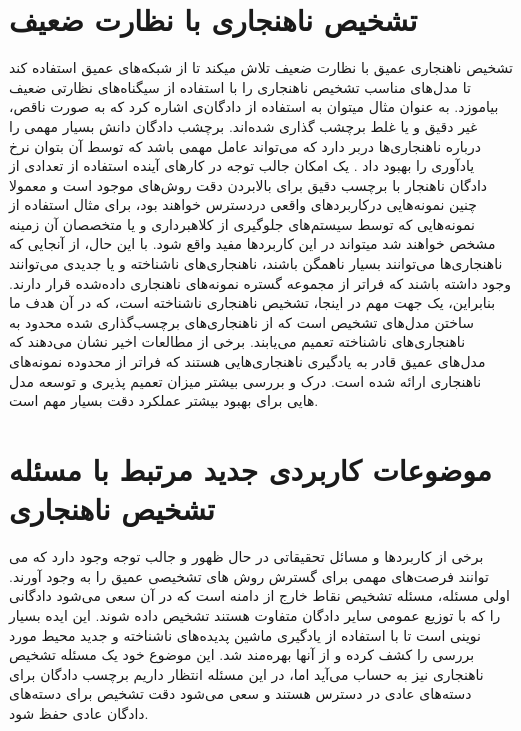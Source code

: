 \documentclass[12pt,a4paper]{report}
\theoremstyle{definition}
\theoremstyle{definition}
\begin{document}
\section{تشخیص ناهنجاری با نظارت ضعیف}
تشخیص ناهنجاری عمیق با نظارت ضعیف\cite{tian2021weakly, https://doi.org/10.48550/arxiv.1910.13601} تلاش میکند تا از شبکه‌های عمیق استفاده کند تا مدل‌های مناسب تشخیص ناهنجاری را با استفاده از سیگناه‌های نظارتی ضعیف بیاموزد. به عنوان مثال میتوان به استفاده از دادگان‌ی اشاره کرد که به صورت ناقص، غیر دقیق و یا غلط برچشب گذاری شده‌اند. برچشب دادگان دانش بسیار مهمی را درباره ناهنجاری‌ها دربر دارد که می‌تواند عامل مهمی باشد که توسط آن بتوان نرخ‌ یادآوری را بهبود داد \cite{0e1339c0e4924d93b1695af2f9e3e03c, https://doi.org/10.48550/arxiv.1910.13601, tian2021weakly, Sultani_2018_CVPR}. یک امکان جالب توجه در کار‌های آینده استفاده از تعدادی از دادگان ناهنجار با برچسب دقیق برای بالابردن دقت روش‌های موجود است و معمولا چنین نمونه‌هایی درکاربرد‌های واقعی دردسترس خواهند بود، برای مثال استفاده از نمونه‌هایی که توسط سیستم‌های جلوگیری از کلاهبرداری و یا متخصصان آن زمینه مشخص خواهند شد میتواند در این کاربرد‌ها مفید واقع شود. با این حال، از آنجایی که ناهنجاری‌ها می‌توانند بسیار ناهمگن باشند، ناهنجاری‌های ناشناخته و یا جدیدی می‌توانند وجود داشته باشند که فراتر از مجموعه گستره نمونه‌های ناهنجاری داده‌شده قرار دارند. بنابراین، یک جهت مهم در اینجا، تشخیص ناهنجاری ناشناخته است، که در آن هدف ما ساختن مدل‌های تشخیص است که از ناهنجاری‌های برچسب‌گذاری شده محدود به ناهنجاری‌های ناشناخته تعمیم می‌یابند. برخی از مطالعات اخیر\cite{Pang_2021, https://doi.org/10.48550/arxiv.1910.13601, pang2019deep, https://doi.org/10.48550/arxiv.1906.02694} نشان می‌دهند که مدل‌های عمیق قادر به یادگیری ناهنجاری‌هایی هستند که فراتر از محدوده نمونه‌های ناهنجاری ارائه شده است. درک و بررسی بیشتر میزان تعمیم پذیری و توسعه مدل هایی برای بهبود بیشتر عملکرد دقت بسیار مهم است. \\

\section{موضوعات کاربردی جدید مرتبط با مسئله تشخیص ناهنجاری}
برخی از کاربرد‌ها و مسائل تحقیقاتی در حال ظهور و جالب توجه وجود دارد که می توانند فرصت‌های مهمی برای گسترش روش های تشخیصی عمیق  را به وجود آورند. اولی مسئله، مسئله تشخیص نقاط خارج از دامنه است که در آن سعی می‌شود دادگانی را که با توزیع عمومی سایر دادگان متفاوت هستند تشخیص داده شوند\cite{https://doi.org/10.48550/arxiv.1610.02136, NEURIPS2018_abdeb6f5, https://doi.org/10.48550/arxiv.1906.02845}. این ایده بسیار نوینی است تا با استفاده از یادگیری ماشین پدیده‌های ناشناخته و جدید محیط مورد بررسی را کشف کرده و از آنها بهره‌مند شد. این موضوع خود یک مسئله تشخیص ناهنجاری نیز به حساب می‌آید اما، در این مسئله انتظار داریم برچسب دادگان برای دسته‌های عادی در دسترس هستند و سعی می‌شود دقت تشخیص برای دسته‌های دادگان عادی حفظ شود. \\
\end{document}
